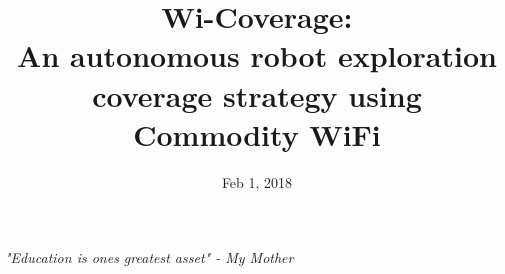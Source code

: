 \documentclass[a4paper, 11pt, oneside]{Thesis}  %
\begin{document}
\title  {Wi-Coverage: \\ An autonomous robot exploration coverage strategy using\\ \vspace{0.45em} Commodity WiFi}
\vspace{5em}
\addresses  {\groupname\\\deptname\\\univname}  %
\date       {Feb 1, 2018}
\subject    {}
\keywords   {}
\maketitle


\fancyhead{}  %
\rhead{\thepage}  %
\lhead{}  %

\pagestyle{fancy}  %

\pagestyle{empty}  %
\null\vfill
\begin{center}
\vspace{19em}
\textit{"Education is ones greatest asset" - My Mother}
\end{center}
\end{document}
